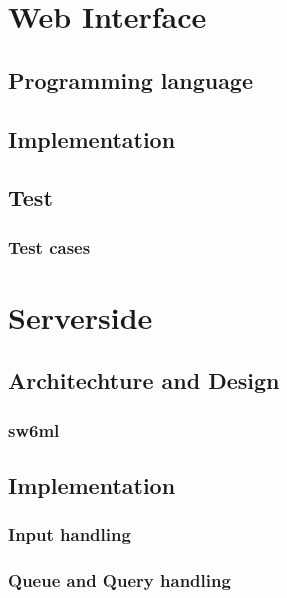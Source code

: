   \section{Web Interface}
    \label{sect:webInterface}
    
      \subsection{Programming language}
        
      \subsection{Implementation}
        
      \subsection{Test}
        
      \subsubsection{Test cases}
        

  \section{Serverside} %
    
    \subsection{Architechture and Design}
      \label{sect:ssArchAndDesign}
	
      \subsubsection{sw6ml} %
	\label{sw6ml}
        
	  
    \subsection{Implementation}
	
      \subsubsection{Input handling} %
	
      \subsubsection{Queue and Query handling} %
	\label{QQHandling}
	  
